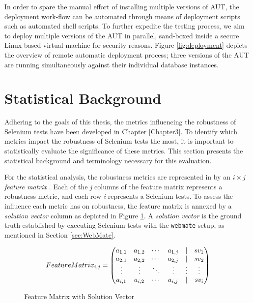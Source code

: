 In order to spare the manual effort of installing multiple versions of AUT, the deployment work-flow can be automated through means of deployment scripts such as automated shell scripts. To further expedite the testing process, we aim to deploy multiple versions of the AUT in parallel, sand-boxed inside a secure Linux based virtual machine for security reasons. Figure \ref{fig:deployment} depicts the overview of remote automatic deployment process; three versions of the AUT are running simultaneously against their individual database instances.


\section{Statistical Background}
\label{sec:Statistical}
Adhering to the goals of this thesis, the metrics influencing the robustness of Selenium tests have been developed in Chapter \ref{Chapter3}. To identify which metrics impact the robustness of Selenium tests the most, it is important to statistically evaluate the significance of these metrics. This section presents the statistical background and terminology necessary for this evaluation.

For the statistical analysis, the robustness metrics are represented in by an $i\times j$  \textit{feature matrix} \cite{li2005lasso}. Each of the \textit{j} columns of the feature matrix represents a robustness metric, and each row
\textit{i} represents a Selenium tests. To assess the influence each metric has on robustness, the feature matrix is annexed by a \textit{solution vector} column as depicted in Figure \ref{fig:featurematrix}. A \textit{solution vector} is the ground truth established by executing Selenium tests with the \texttt{webmate} setup, as mentioned in Section \ref{sec:WebMate}.

\begin{figure}[ht]
\[
Feature\smallskip Matrix_{i,j} = 
\begin{pmatrix}
  a_{1,1} & a_{1,2} & \cdots & a_{1,j} & | & \textit{$sv_{1}$}\\
  a_{2,1} & a_{2,2} & \cdots & a_{2,j} & | & \textit{$sv_{2}$}\\
  \vdots  & \vdots  & \ddots & \vdots  & \vdots & \vdots \\
  a_{i,1} & a_{i,2} & \cdots & a_{i,j} & | & \textit{$sv_{i}$}
\end{pmatrix}
\]
\caption{Feature Matrix with Solution Vector}
\label{fig:featurematrix}
\end{figure}

